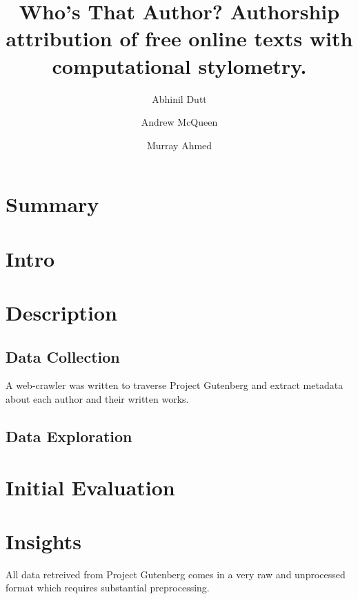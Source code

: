 \documentclass[sigconf, nonacm]{acmart}
\begin{document}
\title{Who's That Author? Authorship attribution of free online texts with computational stylometry.}

\author{Abhinil Dutt}

\author{Andrew McQueen}
\authornotemark[1]

\author{Murray Ahmed}
\authornotemark[1]



\maketitle



\section{Summary}






\section{Intro}






\section{Description}

\subsection{Data Collection}

A web-crawler was written to traverse Project Gutenberg and extract metadata about each author and their written works. 


\subsection{Data Exploration}





\section{Initial Evaluation}






\section{Insights}


All data retreived from Project Gutenberg comes in a very raw and unprocessed format which requires
substantial preprocessing. 
\end{document}

